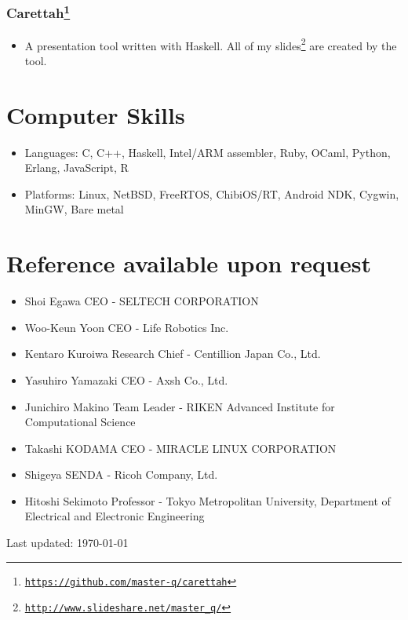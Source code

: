 \documentclass[letterpaper]{article}
\def\footer{
  \begin{center}
    \begin{footnotesize}
      Last updated: \today
    \end{footnotesize}
  \end{center}
}
\begin{document}
\subsubsection*{Carettah\footnote{\href{https://github.com/master-q/carettah}{\tt https://github.com/master-q/carettah}}}
\begin{itemize}
\item A presentation tool written with Haskell. All of my slides\footnote{\href{http://www.slideshare.net/master\_q/}{\tt http://www.slideshare.net/master\_q/}} are created by the tool.
\end{itemize}

\section*{Computer Skills}

\begin{itemize}
  \item Languages: C, C++, Haskell, Intel/ARM assembler, Ruby, OCaml, Python, Erlang, JavaScript, R
  \item Platforms: Linux, NetBSD, FreeRTOS, ChibiOS/RT, Android NDK, Cygwin, MinGW, Bare metal
\end{itemize}

\section*{Reference available upon request}

\begin{itemize}
  \item Shoi Egawa CEO - SELTECH CORPORATION
  \item Woo-Keun Yoon CEO - Life Robotics Inc.
  \item Kentaro Kuroiwa Research Chief - Centillion Japan Co., Ltd.
  \item Yasuhiro Yamazaki CEO - Axsh Co., Ltd.
  \item Junichiro Makino Team Leader - RIKEN Advanced Institute for Computational Science
  \item Takashi KODAMA CEO - MIRACLE LINUX CORPORATION
  \item Shigeya SENDA - Ricoh Company, Ltd.
  \item Hitoshi Sekimoto Professor - Tokyo Metropolitan University, Department of Electrical and Electronic Engineering
\end{itemize}

\bigskip
\footer
\end{document}
